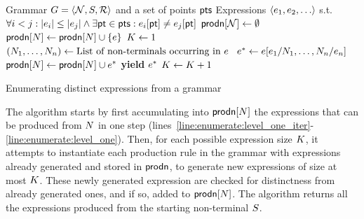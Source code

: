 \begin{appendices}
\begin{algorithm}
  \begin{algorithmic}[1]
    \fontsize{8}{10}\selectfont
    \Require Grammar $G = \langle  \mathcal{N}, S, \mathcal{R}  \rangle$ and a set of points $\mathsf{pts}$
    \Ensure Expressions $\langle  e_1, e_2, \ldots  \rangle$ s.t. $\forall i < j : \vert e_i \vert \leq \vert e_j
    \vert \wedge \exists \mathsf{pt} \in \mathsf{pts} : e_i[\mathsf{pt}] \neq e_j[\mathsf{pt}]$
    \ForAll {$\NonTerminal \in \NonTerminals$} $\mathsf{prodn}[\mathcal{N}] \gets \emptyset$ \EndFor
    \ForAll {$(\NonTerminal, \Expr) \in \Rules$}\label{line:enumerate:level_one_iter}
    \If { $\Expr \in \Theory[\FormalParameters]$ }
    $\mathsf{prodn}[N] \gets \mathsf{prodn}[N] \cup \{ e \}$  \label{line:enumerate:level_one}
    \EndIf
    \EndFor
    \State $ K \gets 1 $
    \While { $\True$ }
    \ForAll {$(\NonTerminal, \Expr) \in \Rules$}
    \State $(N_1, \ldots, N_n) \gets \mbox{List of non-terminals occurring in $e$ }$
    \State $e^* \gets e[e_1/N_1,\ldots,N_n/e_n]$
    \State $\mathsf{prodn}[N] \gets \mathsf{prodn}[N] \cup e^*$
    \If { $\NonTerminal = \StartSymbol$ } \textbf{yield} $e^*$ \EndIf
    \EndIf
    \EndFor
    \EndFor
    \State $K \gets K + 1$
    \EndWhile
  \end{algorithmic}
  \caption{Enumerating distinct expressions from a grammar}
  \label{algo:enumerate}
\end{algorithm}

The algorithm starts by first accumulating into
$\mathsf{prodn}[N]$ the expressions that can be produced from
$N$ in one step
(lines~\ref{line:enumerate:level_one_iter}-\ref{line:enumerate:level_one}).
Then, for each possible expression size $K$, it attempts to
instantiate each production rule in the grammar with expressions already
generated and stored in $\mathsf{prodn}$, to generate new expressions of
size at most $K$.
These newly generated expression are checked for distinctness from
already generated ones, and if so, added to
$\mathsf{prodn}[N]$.
The algorithm returns all the expressions produced from the starting
non-terminal $S$.


\end{appendices}
